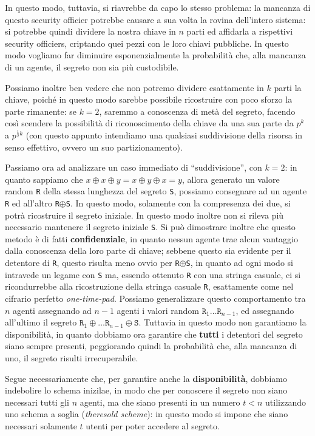 In questo modo, tuttavia, si riavrebbe da capo lo stesso problema: la mancanza
di questo security officier potrebbe causare a sua volta la rovina dell'intero
sistema: si potrebbe quindi dividere la nostra chiave in $n$ parti ed affidarla
a rispettivi security officiers, criptando quei pezzi con le loro chiavi pubbliche.
In questo modo vogliamo far diminuire esponenzialmente la probabilità che,
alla mancanza di un agente, il segreto non sia più custodibile. 


Possiamo inoltre ben vedere che non potremo dividere esattamente in $k$ parti 
la chiave, poiché in questo modo sarebbe possibile ricostruire con poco 
sforzo la parte rimanente: se $k=2$, saremmo a conoscenza di 
metà del segreto, facendo così scendere la possibilità di riconoscimento della
chiave da una sua parte da $p^k$ a $p^{\frac{1}{2}k}$ (con questo appunto
intendiamo una qualsiasi suddivisione della risorsa in senso effettivo, ovvero
un suo partizionamento).


Passiamo ora ad analizzare un caso immediato di ``suddivisione'', con $k=2$:
in quanto sappiamo che $x \oplus x \oplus y = x\oplus y \oplus x = y$, allora
generato un valore random \texttt R della stessa lunghezza del segreto \texttt S,
possiamo consegnare ad un agente \texttt R ed all'altro \texttt R$\oplus$\texttt S. In questo
modo, solamente con la compresenza dei due, si potrà ricostruire il segreto iniziale.
In questo modo inoltre non si rileva più necessario mantenere il segreto iniziale
\texttt S. Si può dimostrare inoltre che questo metodo è di fatti \textbf{confidenziale},
in quanto nessun agente trae alcun vantaggio dalla conoscenza della loro parte
di chiave; sebbene questo sia evidente per il detentore di \texttt R, questo risulta
meno ovvio per \texttt R$\oplus$\texttt S, in quanto ad ogni modo si intravede un legame
con \texttt S ma, essendo ottenuto \texttt R con una stringa casuale, ci si ricondurrebbe
alla ricostruzione della stringa casuale \texttt R, esattamente come nel cifrario
perfetto \textit{one-time-pad}. Possiamo generalizzare questo comportamento 
tra $n$ agenti assegnando ad $n-1$ agenti i valori random $\mathtt R_1\dots \mathtt R_{n-1}$,
ed assegnando all'ultimo il segreto $\mathtt R_1\oplus\dots \mathtt R_{n-1}\oplus \mathtt S$.
Tuttavia in questo modo non garantiamo la disponibilità, in quanto dobbiamo 
ora garantire che \textbf{tutti} i detentori del segreto siano sempre presenti,
peggiorando quindi la probabilità che, alla mancanza di uno, il segreto risulti
irrecuperabile. 


Segue necessariamente che, per garantire anche la \textbf{disponibilità}, dobbiamo
indebolire lo schema inizilae, in modo che per conoscere il segreto non siano
necessari tutti gli $n$ agenti, ma che siano presenti in un numero $t<n$
utilizzando uno schema a soglia (\textit{theresold scheme}): in questo modo si impone
che siano necessari solamente $t$ utenti per poter accedere al segreto.


